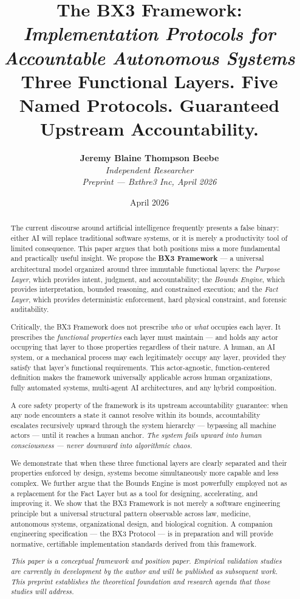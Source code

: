\documentclass[12pt]{article}
\title{
    \vspace{1.2cm}
    {\LARGE \textbf{The BX3 Framework:}}\\[0.6em]
    {\large \textit{Implementation Protocols for Accountable Autonomous Systems}}\\[1.0em]
    {\normalsize Three Functional Layers. Five Named Protocols. Guaranteed Upstream Accountability.}
}
\author{
    \textbf{Jeremy Blaine Thompson Beebe}\\[0.2em]
    \textit{Independent Researcher}\\[0.3em]
    \textit{Preprint — Bxthre3 Inc, April 2026}\\[0.3em]
}
\date{April 2026}
\begin{document}
\maketitle
\thispagestyle{fancy}

\begin{abstract}
\noindent
The current discourse around artificial intelligence frequently presents a false binary: either AI will replace traditional software systems, or it is merely a productivity tool of limited consequence. This paper argues that both positions miss a more fundamental and practically useful insight. We propose the \textbf{BX3 Framework} --- a universal architectural model organized around three immutable functional layers: the \textit{Purpose Layer}, which provides intent, judgment, and accountability; the \textit{Bounds Engine}, which provides interpretation, bounded reasoning, and constrained execution; and the \textit{Fact Layer}, which provides deterministic enforcement, hard physical constraint, and forensic auditability.

Critically, the BX3 Framework does not prescribe \textit{who} or \textit{what} occupies each layer. It prescribes the \textit{functional properties} each layer must maintain --- and holds any actor occupying that layer to those properties regardless of their nature. A human, an AI system, or a mechanical process may each legitimately occupy any layer, provided they satisfy that layer's functional requirements. This actor-agnostic, function-centered definition makes the framework universally applicable across human organizations, fully automated systems, multi-agent AI architectures, and any hybrid composition.

A core safety property of the framework is its upstream accountability guarantee: when any node encounters a state it cannot resolve within its bounds, accountability escalates recursively upward through the system hierarchy --- bypassing all machine actors --- until it reaches a human anchor. \textit{The system fails upward into human consciousness --- never downward into algorithmic chaos.}

We demonstrate that when these three functional layers are clearly separated and their properties enforced by design, systems become simultaneously more capable and less complex. We further argue that the Bounds Engine is most powerfully employed not as a replacement for the Fact Layer but as a tool for designing, accelerating, and improving it. We show that the BX3 Framework is not merely a software engineering principle but a universal structural pattern observable across law, medicine, autonomous systems, organizational design, and biological cognition. A companion engineering specification --- the BX3 Protocol --- is in preparation and will provide normative, certifiable implementation standards derived from this framework.

\vspace{0.5em}
\noindent\textit{This paper is a conceptual framework and position paper. Empirical validation studies are currently in development by the author and will be published as subsequent work. This preprint establishes the theoretical foundation and research agenda that those studies will address.}
\end{abstract}
\end{document}
